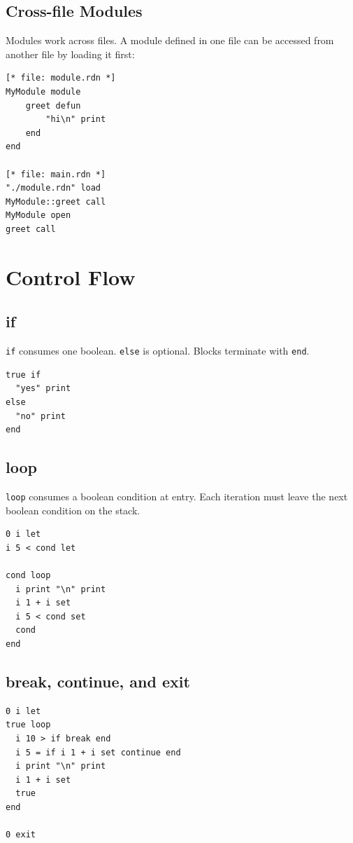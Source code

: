 \documentclass[11pt,a4paper]{article}
\newcommand{\code}[1]{\texttt{#1}}
\begin{document}
\subsection{Cross-file Modules}

Modules work across files. A module defined in one file can be accessed
from another file by loading it first:

\begin{lstlisting}[language=Raden]
[* file: module.rdn *]
MyModule module
    greet defun
        "hi\n" print
    end
end

[* file: main.rdn *]
"./module.rdn" load
MyModule::greet call
MyModule open
greet call
\end{lstlisting}

\section{Control Flow}

\subsection{if}

\code{if} consumes one boolean. \code{else} is optional. Blocks terminate
with \code{end}.

\begin{lstlisting}[language=Raden]
true if
  "yes" print
else
  "no" print
end
\end{lstlisting}

\subsection{loop}

\code{loop} consumes a boolean condition at entry. Each iteration must
leave the next boolean condition on the stack.

\begin{lstlisting}[language=Raden]
0 i let
i 5 < cond let

cond loop
  i print "\n" print
  i 1 + i set
  i 5 < cond set
  cond
end
\end{lstlisting}

\subsection{break, continue, and exit}

\begin{lstlisting}[language=Raden]
0 i let
true loop
  i 10 > if break end
  i 5 = if i 1 + i set continue end
  i print "\n" print
  i 1 + i set
  true
end

0 exit
\end{lstlisting}
\end{document}
